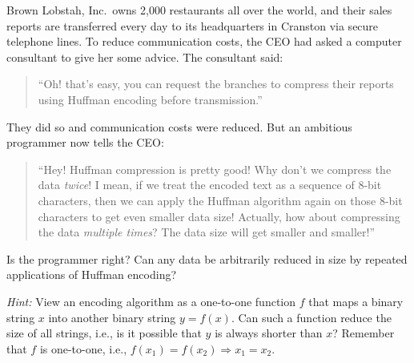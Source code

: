 Brown Lobstah, Inc.\  owns 2,000 restaurants all over the world, and their
sales reports are transferred every day to its headquarters in Cranston
via secure telephone lines.  To reduce communication costs, the CEO
had asked a computer consultant to give her some advice. The consultant
said:

\begin{quote}
	``Oh! that's easy, you can request the branches to compress their
	reports using Huffman encoding before transmission.''
\end{quote}

They did so and communication costs were reduced.  But an ambitious
programmer now tells the CEO:

\begin{quote}
	``Hey! Huffman compression is pretty good!  Why don't we compress the
	data {\em twice\/}! I mean, if we treat the encoded text as a sequence
	of 8-bit characters, then we can apply the Huffman algorithm again on
	those 8-bit characters to get even smaller data size!  Actually, how
	about compressing the data {\em multiple times\/}?  The data size will
	get smaller and smaller!''
\end{quote}

Is the programmer right?   Can any data be arbitrarily reduced in
size by repeated applications of Huffman encoding?

{\em Hint:} View an encoding algorithm as a one-to-one function $f$
that maps a binary string $x$ into another binary string $y=f(x)$.  Can such
a function reduce the size of all strings, i.e., is it possible that
$y$ is always shorter than $x$?  Remember that $f$ is one-to-one,
i.e., $f(x_1) =f(x_2) \Longrightarrow  x_1 = x_2$.

